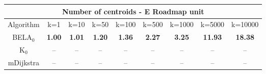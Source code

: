 \begin{tabular}{c|cccccccc}\toprule
\multicolumn{9}{c}{Number of centroids - E Roadmap unit}\\ \midrule
Algorithm & k=1 & k=10 & k=50 & k=100 & k=500 & k=1000 & k=5000 & k=10000 \\ \midrule
BELA$_0$ & \textbf{1.00} & \textbf{1.01} & \textbf{1.20} & \textbf{1.36} & \textbf{2.27} & \textbf{3.25} & \textbf{11.93} & \textbf{18.38} \\
K$_0$ & -- & -- & -- & -- & -- & -- & -- & -- \\
mDijkstra & -- & -- & -- & -- & -- & -- & -- & -- \\ \bottomrule 
\end{tabular}
